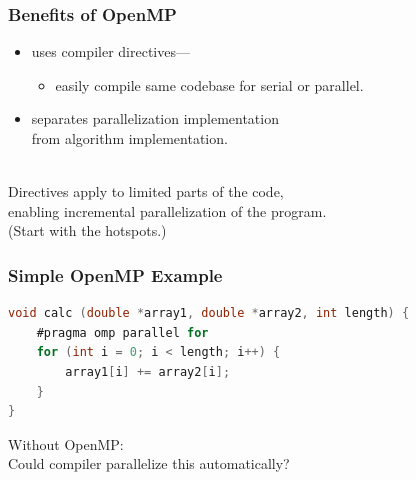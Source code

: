 \begin{frame}
  \frametitle{Benefits of OpenMP}

\large
  
\begin{changemargin}{1.5cm}
  \begin{itemize}
    \item uses compiler directives---
      \begin{itemize}
        \item easily compile same codebase for serial or parallel.
      \end{itemize}
    \item separates parallelization implementation\\
      from algorithm implementation.
   \end{itemize}~\\[-2em]

    Directives apply to limited parts of the code, \\
    enabling incremental parallelization of the program.\\
    (Start with the hotspots.)
\end{changemargin}
\end{frame}

\begin{frame}[fragile]
  \frametitle{Simple OpenMP Example}

  
  \begin{lstlisting}[language=C,morekeywords={foreach,pragma,omp,parallel,single,nowait,task,untied,barrier,taskyield}]
void calc (double *array1, double *array2, int length) {
    #pragma omp parallel for
    for (int i = 0; i < length; i++) {
        array1[i] += array2[i];
    }
}
  \end{lstlisting}

\Large
\begin{changemargin}{.5cm}
  Without OpenMP: \\ \quad Could compiler parallelize this automatically?
\end{changemargin}

\end{frame}

